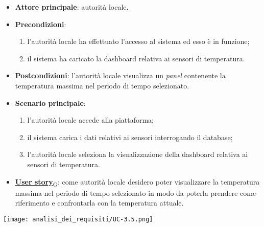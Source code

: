 \begin{itemize}
	\item \textbf{Attore principale}: autorità locale.
	\item \textbf{Precondizioni}:
	      \begin{enumerate}
		      \item l'autorità locale ha effettuato l'accesso al sistema ed esso è in funzione;
		      \item il sistema ha caricato la dashboard relativa ai sensori di temperatura.
	      \end{enumerate}
	\item \textbf{Postcondizioni}: l'autorità locale visualizza un \textit{panel} contenente la temperatura massima nel periodo di tempo selezionato.
	\item \textbf{Scenario principale}:
	      \begin{enumerate}
		      \item l'autorità locale accede alla piattaforma;
		      \item il sistema carica i dati relativi ai sensori interrogando il database;
		      \item l'autorità locale seleziona la visualizzazione della dashboard relativa ai sensori di temperatura.
	      \end{enumerate}
	\item \href{https://7last.github.io/docs/rtb/documentazione-interna/glossario\#user-story}{\textbf{User story}\textsubscript{G}}:
	      come autorità locale desidero poter visualizzare la temperatura massima nel periodo di tempo selezionato
	      in modo da poterla prendere come riferimento e confrontarla con la temperatura attuale.
\end{itemize}
\begin{center}
	\texttt{[image: analisi\_dei\_requisiti/UC-3.5.png]}
\end{center}


